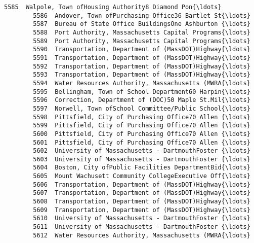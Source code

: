 \documentclass[11pt]{article}
\begin{document}
\begin{Verbatim}[commandchars=\\\{\}]
        5585  Walpole, Town ofHousing Authority8 Diamond Pon{\ldots}   
        5586  Andover, Town ofPurchasing Office36 Bartlet St{\ldots}   
        5587  Bureau of State Office BuildingsOne Ashburton {\ldots}   
        5588  Port Authority, Massachusetts Capital Programs{\ldots}   
        5589  Port Authority, Massachusetts Capital Programs{\ldots}   
        5590  Transportation, Department of (MassDOT)Highway{\ldots}   
        5591  Transportation, Department of (MassDOT)Highway{\ldots}   
        5592  Transportation, Department of (MassDOT)Highway{\ldots}   
        5593  Transportation, Department of (MassDOT)Highway{\ldots}   
        5594  Water Resources Authority, Massachusetts (MWRA{\ldots}   
        5595  Bellingham, Town of School Department60 Harpin{\ldots}   
        5596  Correction, Department of (DOC)50 Maple St.Mil{\ldots}   
        5597  Norwell, Town ofSchool Committee/Public School{\ldots}   
        5598  Pittsfield, City of Purchasing Office70 Allen {\ldots}   
        5599  Pittsfield, City of Purchasing Office70 Allen {\ldots}   
        5600  Pittsfield, City of Purchasing Office70 Allen {\ldots}   
        5601  Pittsfield, City of Purchasing Office70 Allen {\ldots}   
        5602  University of Massachusetts - DartmouthFoster {\ldots}   
        5603  University of Massachusetts - DartmouthFoster {\ldots}   
        5604  Boston, City ofPublic Facilities DepartmentBid{\ldots}   
        5605  Mount Wachusett Community CollegeExecutive Off{\ldots}   
        5606  Transportation, Department of (MassDOT)Highway{\ldots}   
        5607  Transportation, Department of (MassDOT)Highway{\ldots}   
        5608  Transportation, Department of (MassDOT)Highway{\ldots}   
        5609  Transportation, Department of (MassDOT)Highway{\ldots}   
        5610  University of Massachusetts - DartmouthFoster {\ldots}   
        5611  University of Massachusetts - DartmouthFoster {\ldots}   
        5612  Water Resources Authority, Massachusetts (MWRA{\ldots}   
        

\end{Verbatim}
\end{document}
